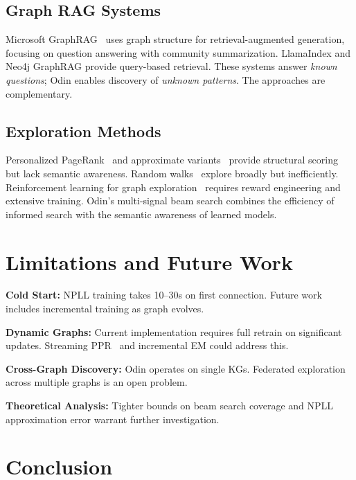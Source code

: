 \documentclass[10pt,twocolumn]{article}
\begin{document}
\subsection{Graph RAG Systems}

Microsoft GraphRAG~\cite{edge2024local} uses graph structure for retrieval-augmented generation, focusing on question answering with community summarization. LlamaIndex and Neo4j GraphRAG provide query-based retrieval. These systems answer \textit{known questions}; Odin enables discovery of \textit{unknown patterns}. The approaches are complementary.

\subsection{Exploration Methods}

Personalized PageRank~\cite{haveliwala2002topic} and approximate variants~\cite{andersen2006local} provide structural scoring but lack semantic awareness. Random walks~\cite{perozzi2014deepwalk} explore broadly but inefficiently. Reinforcement learning for graph exploration~\cite{chen2018reinforcement} requires reward engineering and extensive training. Odin's multi-signal beam search combines the efficiency of informed search with the semantic awareness of learned models.

\section{Limitations and Future Work}

\textbf{Cold Start:} NPLL training takes 10--30s on first connection. Future work includes incremental training as graph evolves.

\textbf{Dynamic Graphs:} Current implementation requires full retrain on significant updates. Streaming PPR~\cite{bahmani2010fast} and incremental EM could address this.

\textbf{Cross-Graph Discovery:} Odin operates on single KGs. Federated exploration across multiple graphs is an open problem.

\textbf{Theoretical Analysis:} Tighter bounds on beam search coverage and NPLL approximation error warrant further investigation.

\section{Conclusion}
\end{document}
